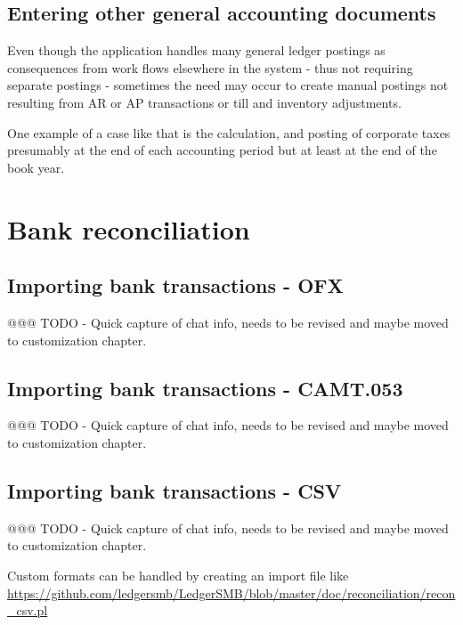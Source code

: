 \subsection{Entering other general accounting documents}
\label{subsec-workflows-accounting-entry-others}

Even though the application handles many general ledger postings as consequences
from work flows elsewhere in the system - thus not requiring separate postings -
sometimes the need may occur to create manual postings not resulting from
AR or AP transactions or till and inventory adjustments.

One example of a case like that is the calculation, and posting of
corporate taxes presumably at the end of each accounting period but at least
at the end of the book year.



\section{Bank reconciliation}
\label{sec-workflows-accounting-reconciliation}

\subsection{Importing bank transactions - OFX}
\label{subsec-importing-bank-transactions-ofx}

@@@ TODO - Quick capture of chat info, needs to be revised and maybe moved to customization chapter.

\subsection{Importing bank transactions - CAMT.053}
\label{subsec-importing-bank-transactions-camt}

@@@ TODO - Quick capture of chat info, needs to be revised and maybe moved to customization chapter.

\subsection{Importing bank transactions - CSV}
\label{subsec-importing-bank-transactions-csv}


@@@ TODO - Quick capture of chat info, needs to be revised and maybe moved to customization chapter.

Custom formats can be handled by creating an import file
like \url{https://github.com/ledgersmb/LedgerSMB/blob/master/doc/reconciliation/recon_csv.pl}

